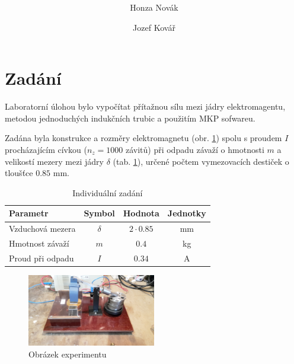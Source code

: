 \documentclass[11pt,oneside]{article} %
\title{\protokol \\ \large \uloha}
\author{Honza Novák \and Jozef Kovář}
\begin{document}
\maketitle
\thispagestyle{titulni}

\newpage

\section*{Zadání}

Laboratorní úlohou bylo vypočítat přítažnou sílu mezi jádry elektromagentu, metodou jednoduchých indukčních trubic a použitím MKP sofwareu.

Zadána byla konstrukce a rozměry elektromagnetu (obr. \ref{fig:zadani}) spolu s proudem $I$ procházajícím cívkou ($n_z = 1000$ závitů) při odpadu závaží o hmotnosti $m$ a velikostí mezery mezi jádry $\delta$ (tab. \ref{tab:zadani}), určené počtem vymezovacích destiček o tloušťce $0.85$ mm.

\begin{table}[h]
   \centering
   \begin{tabular}{|l|c|c|c|}
      \hline
      Parametr          & Symbol    & Hodnota         & Jednotky  \\
      \hline
      Vzduchová mezera  & $\delta$  & $2 \cdot 0.85$  & \si{\milli\metre} \\
      Hmotnost závaží   & $m$       & $0.4$           & \si{\kilogram} \\
      Proud při odpadu  & $I$       & $0.34$          & \si{\ampere} \\
      \hline
   \end{tabular}
   \caption{Individuální zadání}
   \label{tab:zadani}
\end{table}

\vspace{5mm}

\begin{figure}[h]
   \centering
   \includegraphics[width=0.5\textwidth]{obrazky/Magnet_2}
   \caption{Obrázek experimentu}
   \label{fig:zadani}
\end{figure}
\end{document}
